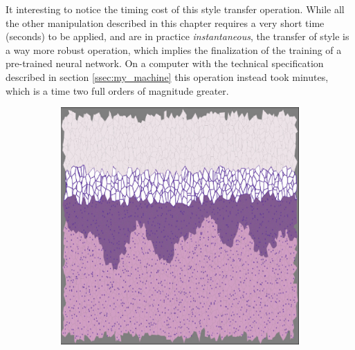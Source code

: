 \begin{description}
        It interesting to notice the timing cost of this style transfer operation. While all the other manipulation described in this chapter requires a very short time (seconds) to be applied, and are in practice \textit{instantaneous}, the transfer of style is a way more robust operation, which implies the finalization of the training of a pre-trained neural network. On a computer with the technical specification described in section \ref{ssec:my_machine} this operation instead took minutes, which is a time two full orders of magnitude greater.

        \begin{figure}
            \centering
            \begin{subfigure}[t]{0.3\textwidth}
                 \centering
                 \includegraphics[width = \textwidth]{images/st_nn4}
                 \caption{}
                 \label{fig:st_nn4}
            \end{subfigure}
            \quad
            \begin{subfigure}[t]{0.3\textwidth}
                 \centering

\end{subfigure}
\end{figure}
\end{description}
